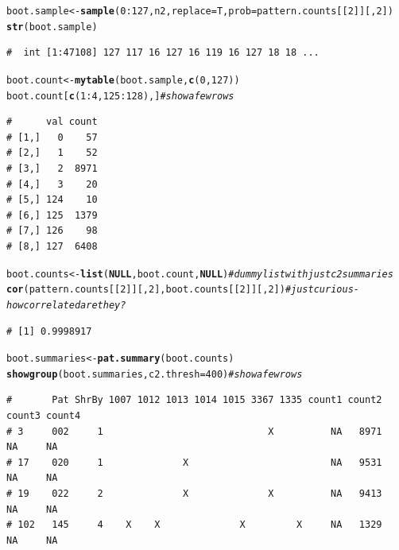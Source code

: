 \documentclass{article}\usepackage[]{graphicx}\usepackage[]{color}
\makeatletter
\newcommand{\hlnum}[1]{\textcolor[rgb]{0.686,0.059,0.569}{#1}}%
\newcommand{\hlcom}[1]{\textcolor[rgb]{0.678,0.584,0.686}{\textit{#1}}}%
\newcommand{\hlopt}[1]{\textcolor[rgb]{0,0,0}{#1}}%
\newcommand{\hlstd}[1]{\textcolor[rgb]{0.345,0.345,0.345}{#1}}%
\newcommand{\hlkwa}[1]{\textcolor[rgb]{0.161,0.373,0.58}{\textbf{#1}}}%
\newcommand{\hlkwb}[1]{\textcolor[rgb]{0.69,0.353,0.396}{#1}}%
\newcommand{\hlkwc}[1]{\textcolor[rgb]{0.333,0.667,0.333}{#1}}%
\newcommand{\hlkwd}[1]{\textcolor[rgb]{0.737,0.353,0.396}{\textbf{#1}}}%
\newenvironment{kframe}{%
 \def\at@end@of@kframe{}%
 \ifinner\ifhmode%
  \def\at@end@of@kframe{\end{minipage}}%
  \begin{minipage}{\columnwidth}%
 \fi\fi%
 \def\FrameCommand##1{\hskip\@totalleftmargin \hskip-\fboxsep
 \colorbox{shadecolor}{##1}\hskip-\fboxsep
     \hskip-\linewidth \hskip-\@totalleftmargin \hskip\columnwidth}%
 \MakeFramed {\advance\hsize-\width
   \@totalleftmargin\z@ \linewidth\hsize
   \@setminipage}}%
 {\par\unskip\endMakeFramed%
 \at@end@of@kframe}
\newenvironment{knitrout}{}{} %
\makeatother
\begin{document}
\begin{knitrout}\footnotesize
{}\color{fgcolor}\begin{kframe}
\begin{alltt}
\hlstd{boot.sample} \hlkwb{<-} \hlkwd{sample}\hlstd{(}\hlnum{0}\hlopt{:}\hlnum{127}\hlstd{,n2,}\hlkwc{replace}\hlstd{=T,}\hlkwc{prob}\hlstd{=pattern.counts[[}\hlnum{2}\hlstd{]][,}\hlnum{2}\hlstd{])}
\hlkwd{str}\hlstd{(boot.sample)}
\end{alltt}
\begin{verbatim}
#  int [1:47108] 127 117 16 127 16 119 16 127 18 18 ...
\end{verbatim}
\begin{alltt}
\hlstd{boot.count} \hlkwb{<-} \hlkwd{mytable}\hlstd{(boot.sample,}\hlkwd{c}\hlstd{(}\hlnum{0}\hlstd{,}\hlnum{127}\hlstd{))}
\hlstd{boot.count[}\hlkwd{c}\hlstd{(}\hlnum{1}\hlopt{:}\hlnum{4}\hlstd{,}\hlnum{125}\hlopt{:}\hlnum{128}\hlstd{),]} \hlcom{# show a few rows}
\end{alltt}
\begin{verbatim}
#      val count
# [1,]   0    57
# [2,]   1    52
# [3,]   2  8971
# [4,]   3    20
# [5,] 124    10
# [6,] 125  1379
# [7,] 126    98
# [8,] 127  6408
\end{verbatim}
\begin{alltt}
\hlstd{boot.counts} \hlkwb{<-} \hlkwd{list}\hlstd{(}\hlkwa{NULL}\hlstd{,boot.count,}\hlkwa{NULL}\hlstd{)} \hlcom{# dummy list with just c2 summaries}
\hlkwd{cor}\hlstd{(pattern.counts[[}\hlnum{2}\hlstd{]][,}\hlnum{2}\hlstd{],boot.counts[[}\hlnum{2}\hlstd{]][,}\hlnum{2}\hlstd{])} \hlcom{# just curious - how correlated are they?}
\end{alltt}
\begin{verbatim}
# [1] 0.9998917
\end{verbatim}
\begin{alltt}
\hlstd{boot.summaries} \hlkwb{<-} \hlkwd{pat.summary}\hlstd{(boot.counts)}
\hlkwd{showgroup}\hlstd{(boot.summaries,}\hlkwc{c2.thresh}\hlstd{=}\hlnum{400}\hlstd{)} \hlcom{#show a few rows}
\end{alltt}
\begin{verbatim}
#       Pat ShrBy 1007 1012 1013 1014 1015 3367 1335 count1 count2 count3 count4
# 3     002     1                             X          NA   8971     NA     NA
# 17    020     1              X                         NA   9531     NA     NA
# 19    022     2              X              X          NA   9413     NA     NA
# 102   145     4    X    X              X         X     NA   1329     NA     NA

\end{verbatim}
\end{kframe}
\end{knitrout}
\end{document}
